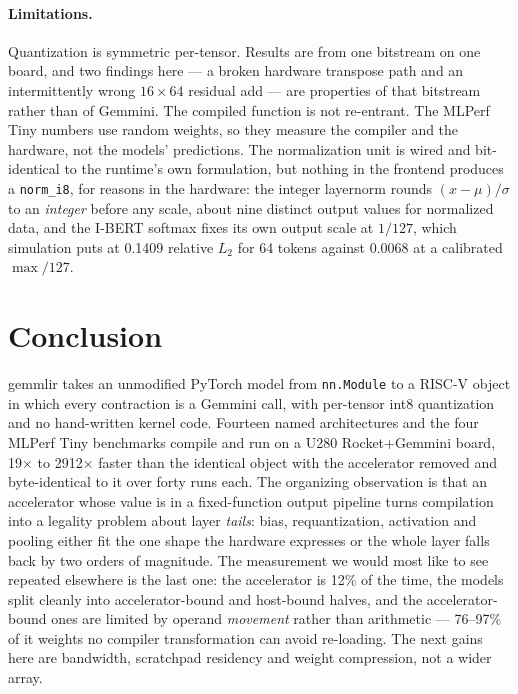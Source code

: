 \documentclass[runningheads]{llncs}
\begin{document}
\paragraph{Limitations.} Quantization is symmetric per-tensor. Results are from one
bitstream on one board, and two findings here --- a broken hardware transpose path
and an intermittently wrong $16{\times}64$ residual add --- are properties of that
bitstream rather than of Gemmini. The compiled function is not re-entrant. The
MLPerf Tiny numbers use random weights, so they measure the compiler and the
hardware, not the models' predictions. The normalization unit is wired and
bit-identical to the runtime's own formulation, but nothing in the frontend
produces a \texttt{norm\_i8}, for reasons in the hardware: the integer layernorm
rounds $(x-\mu)/\sigma$ to an \emph{integer} before any scale, about nine distinct
output values for normalized data, and the I-BERT softmax fixes its own output
scale at $1/127$, which simulation puts at 0.1409 relative $L_2$ for 64 tokens
against 0.0068 at a calibrated $\max/127$.

\section{Conclusion}

gemmlir takes an unmodified PyTorch model from \texttt{nn.Module} to a RISC-V
object in which every contraction is a Gemmini call, with per-tensor int8
quantization and no hand-written kernel code. Fourteen named architectures and the
four MLPerf Tiny benchmarks compile and run on a U280 Rocket+Gemmini board,
19$\times$ to 2912$\times$ faster than the identical object with the accelerator
removed and byte-identical to it over forty runs each. The organizing observation is
that an accelerator whose value is in a fixed-function output pipeline turns
compilation into a legality problem about layer \emph{tails}: bias, requantization,
activation and pooling either fit the one shape the hardware expresses or the whole
layer falls back by two orders of magnitude. The measurement we would most like to
see repeated elsewhere is the last one: the accelerator is 12\% of the time, the
models split cleanly into accelerator-bound and host-bound halves, and the
accelerator-bound ones are limited by operand \emph{movement} rather than
arithmetic --- 76--97\% of it weights no compiler transformation can avoid
re-loading. The next gains here are bandwidth, scratchpad residency and weight
compression, not a wider array.
\end{document}
